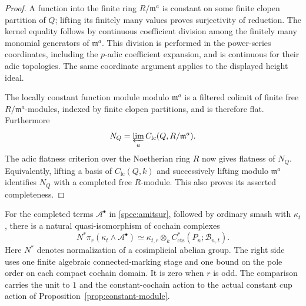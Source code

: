 \begin{proof}
A function into the finite ring \(R/\mathfrak m^a\) is constant on
some finite clopen partition of \(Q\); lifting its finitely many
values proves surjectivity of reduction. The kernel equality follows
by continuous coefficient division among the finitely many monomial
generators of \(\mathfrak m^a\). This division is performed in the
power-series coordinates, including the \(p\)-adic coefficient
expansion, and is continuous for their adic topologies. The same
coordinate argument applies to the displayed height ideal.

The locally constant function module modulo \(\mathfrak m^a\) is
a filtered colimit of finite free \(R/\mathfrak m^a\)-modules,
indexed by finite clopen partitions, and is therefore flat.
Furthermore
\[
N_Q=\varprojlim_a C_{\mathrm{lc}}(Q,R/\mathfrak m^a).
\]
The adic flatness criterion over the Noetherian ring \(R\) now gives
flatness of \(N_Q\). Equivalently, lifting a basis of
\(C_{\mathrm{lc}}(Q,k)\) and successively lifting modulo
\(\mathfrak m^a\) identifies \(N_Q\) with a completed free
\(R\)-module. This also proves its asserted completeness.
\end{proof}

\begin{lemma}
\label{lem:ordinary-residue}
For the completed terms \(\mathcal A^\bullet\) in
\eqref{spec:amitsur}, followed by ordinary smash with \(\kappa_t\),
there is a natural quasi-isomorphism of cochain complexes
\begin{equation}
N^*\pi_r(\kappa_t\wedge\mathcal A^\bullet)
\simeq
\kappa_{t,r}\otimes_k
 C^*_{\mathrm{cts}}(P_n;\mathcal B_{n,t}).
\label{spec:residue-complex}
\end{equation}
Here $N^*$ denotes normalization of a cosimplicial abelian group.
The right side uses one finite algebraic connected-marking stage and
one bound on the pole order on each compact cochain domain. It is zero
when \(r\) is odd. The comparison carries the unit to \(1\) and the
constant-cochain action to the actual constant cup action of
Proposition~\ref{prop:constant-module}.
\end{lemma}


